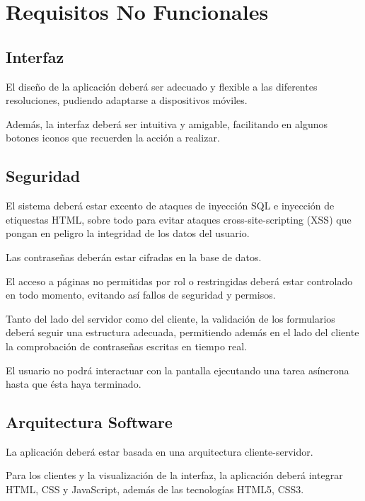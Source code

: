 \chapter{Requisitos No Funcionales}


\section{Interfaz}

El dise\~{n}o de la aplicaci\'{o}n deber\'{a} ser adecuado y flexible a las diferentes resoluciones, pudiendo adaptarse a dispositivos m\'{o}viles.

Adem\'{a}s, la interfaz deber\'{a} ser intuitiva y amigable, facilitando en algunos botones iconos que recuerden la acci\'{o}n a realizar.


\section{Seguridad}

El sistema deber\'{a} estar excento de ataques de inyecci\'{o}n SQL e inyecci\'{o}n de etiquestas HTML, sobre todo para evitar ataques cross-site-scripting (XSS) que pongan en peligro la integridad de los datos del usuario.

Las contrase\~{n}as deber\'{a}n estar cifradas en la base de datos.

El acceso a p\'{a}ginas no permitidas por rol o restringidas deber\'{a} estar controlado en todo momento, evitando as\'{i} fallos de seguridad y permisos.

Tanto del lado del servidor como del cliente, la validaci\'{o}n de los formularios deber\'{a} seguir una estructura adecuada, permitiendo adem\'{a}s en el lado del cliente la comprobaci\'{o}n de contrase\~{n}as escritas en tiempo real.

El usuario no podr\'{a} interactuar con la pantalla ejecutando una tarea as\'{i}ncrona hasta que \'{e}sta haya terminado.


\section{Arquitectura Software}

La aplicaci\'{o}n deber\'{a} estar basada en una arquitectura cliente-servidor.

Para los clientes y la visualizaci\'{o}n de la interfaz, la aplicaci\'{o}n deber\'{a} integrar HTML, CSS y JavaScript, adem\'{a}s de las tecnolog\'{i}as HTML5, CSS3.


